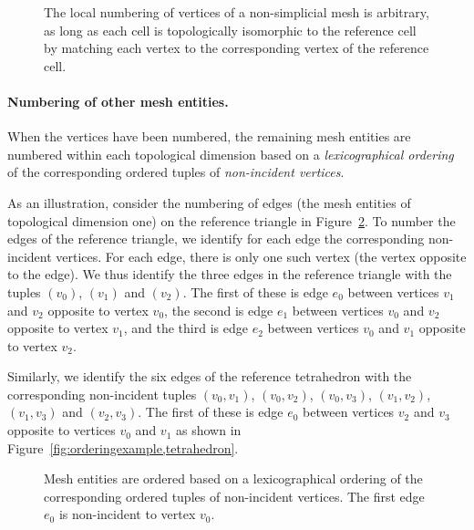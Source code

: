 \begin{figure}
\bwfig
  \begin{center}
    \caption{The local numbering of vertices of a non-simplicial mesh
      is arbitrary, as long as each cell is topologically isomorphic
      to the reference cell by matching each vertex to the
      corresponding vertex of the reference cell.}
    \label{fig:numbering_example_quadrilaterals}
  \end{center}
\end{figure}

\paragraph{Numbering of other mesh entities.}

When the vertices have been numbered, the remaining mesh entities are
numbered within each topological dimension based on a
\emph{lexicographical ordering} of the corresponding ordered tuples of
\emph{non-incident vertices}.

As an illustration, consider the numbering of edges (the mesh entities
of topological dimension one) on the reference triangle in
Figure~\ref{fig:orderingexample,triangle}. To number the edges of the
reference triangle, we identify for each edge the corresponding
non-incident vertices. For each edge, there is only one such vertex
(the vertex opposite to the edge). We thus identify the three edges in
the reference triangle with the tuples $(v_0)$, $(v_1)$ and $(v_2)$. The
first of these is edge $e_0$ between vertices $v_1$ and $v_2$ opposite
to vertex $v_0$, the second is edge $e_1$ between vertices $v_0$ and
$v_2$ opposite to vertex $v_1$, and the third is edge $e_2$ between
vertices $v_0$ and $v_1$ opposite to vertex $v_2$.

Similarly, we identify the six edges of the reference tetrahedron with
the corresponding non-incident tuples $(v_0, v_1)$, $(v_0, v_2)$,
$(v_0, v_3)$, $(v_1, v_2)$, $(v_1, v_3)$ and $(v_2, v_3)$. The first
of these is edge $e_0$ between vertices $v_2$ and $v_3$ opposite to
vertices $v_0$ and $v_1$ as shown in
Figure~\ref{fig:orderingexample,tetrahedron}.

\begin{figure}
  \begin{center}
    \caption{Mesh entities are ordered based on a lexicographical
      ordering of the corresponding ordered tuples of non-incident
      vertices. The first edge $e_0$ is non-incident to vertex $v_0$.}
    \label{fig:orderingexample,triangle}
  \end{center}
\end{figure}

